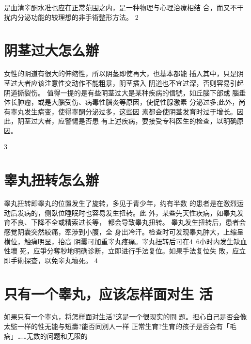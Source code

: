 \documentclass[12pt,UTF8]{ctexbook}
\begin{document}
是血清睾酮水准也应在正常范围之内，是一种物理与心理治療相结
合，而又不干扰内分泌功能的较理想的非手術整形方法。
2
\section{阴茎过大怎么辦}
女性的阴道有很大的伸缩性，所以阴茎即使再大，也基本都能
插入其中，只是阴茎过大者应该注意性交动作不能粗暴，阴茎插入
阴道也不宜过深，否则容易引起阴道撕裂伤。
值得一提的是有些阴茎过大是某种疾病的信號，如丘腦下部或
腦垂体长肿瘤，或是大腦受伤、病毒性腦炎等原因，使促性腺激素
分泌过多;此外，尚有睾丸发生病变，使得睾酮分泌过多，这些因
素都会使阴茎发育时过于增长。因此，阴茎过大者，应警惕是否患
有上述疾病，要接受专科医生的检查，以明确原因。

3
\section{睾丸扭转怎么辦}
睾丸扭转即睾丸的位置发生了旋转，多见于青少年，约有半数
的患者是在激烈运动后发病的，侧臥位睡眠时也容易发生扭转。此
外，某些先天性疾病，如睾丸发育不良、下降不全或精索过长等，
都会导致睾丸扭转。
睾丸发生扭转后，患者会感觉阴囊突然絞痛，牽涉到小腹，全
身出冷汗。检查时可发现睾丸肿大，上缩呈横位，触痛明显，抬高
阴囊可加重睾丸疼痛。睾丸扭转后可在4~6小时内发生缺血性壞
死，应爭分奪秒地明确诊断，立即进行手法复位。如果手法复位失
敗，应立即手術探查，以免睾丸壞死。
4
\section{只有一个睾丸，应该怎样面对生
活}
如果只有一个睾丸，将怎样面对生活?这是一个很现实的問
題。担心自己是否会像太監一样的性无能与短壽?能否同別人一样
正常生育?生育的孩子是否会有「毛病」……无数的问题和无限的
\end{document}
